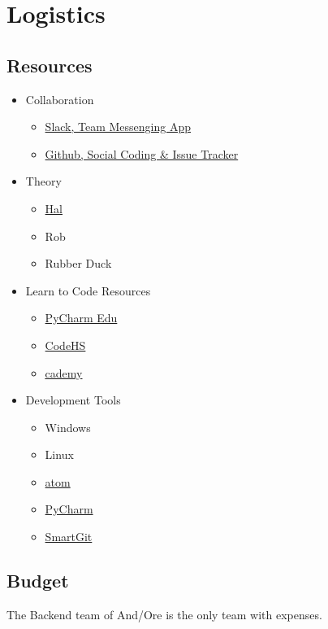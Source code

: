 \documentclass[11pt]{article}
\begin{document}
\section{{\color{blue}Logistics}}

\subsection{{\color{blue}Resources}}

\begin{itemize}
	\item Collaboration
		\begin{itemize}
			\item \href{https://slack.com/}{Slack, Team Messenging App}
			\item \href{https://github.com/}{Github, Social Coding \& Issue Tracker}
		\end{itemize}
	\item Theory
		\begin{itemize}
			\item \href{http://baxter-academy.org/faculty#hlarsson}{Hal}
			\item Rob
			\item Rubber Duck
		\end{itemize}
	\item Learn to Code Resources
		\begin{itemize}
			\item \href{https://www.jetbrains.com/pycharm-edu/}{PyCharm Edu}
			\item \href{https://codehs.com/}{CodeHS}
			\item \href{http://www.codecademy.com/}{\underline{c}ademy}
		\end{itemize}
	\item Development Tools
		\begin{itemize}
			\item Windows
			\item Linux
			\item \href{https://atom.io/}{atom}
			\item \href{https://www.jetbrains.com/pycharm/}{PyCharm}
			\item \href{http://www.syntevo.com/smartgit/}{SmartGit}
		\end{itemize}
\end{itemize}

\subsection{{\color{blue}Budget}}

The Backend team of And/Ore is the only team with expenses.
\end{document}
